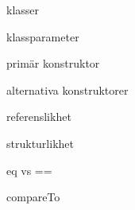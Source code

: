 \item klasser
\item klassparameter
\item primär konstruktor
\item alternativa konstruktorer
\item referenslikhet
\item strukturlikhet
\item eq vs ==
\item compareTo